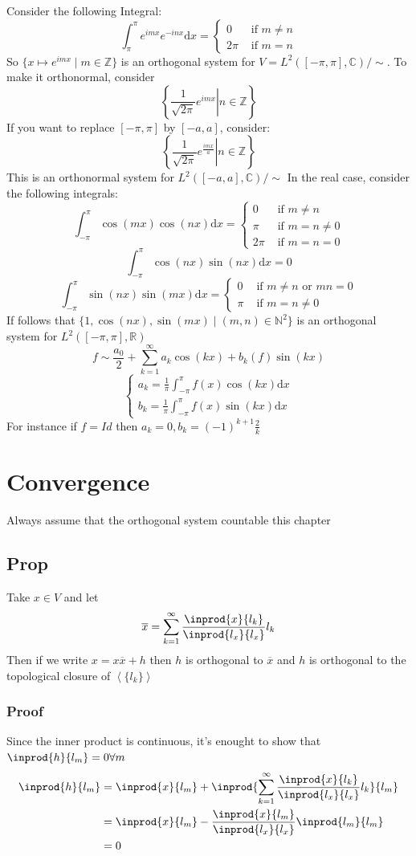 \documentclass{book}
\begin{document}
Consider the following Integral:
$$\int_{\pi}^\pi e^{imx}e^{-inx}\text{d}x=\begin{cases}
    0 & \text{ if }m\neq n\\2\pi&\text{ if }m=n
\end{cases}$$
So $\{x\mapsto e^{imx}\mid m\in \mathbb{Z}\}$ is an orthogonal system for $V=L^2([-\pi,\pi],\mathbb{C})/\sim$. To make it orthonormal, consider
$$\left\{\left.\frac{1}{\sqrt{2\pi}}e^{imx}\right| n\in \mathbb{Z}\right\}$$
If you want to replace $[-\pi,\pi]$ by $[-a,a]$, consider:
$$\left\{\left.\frac{1}{\sqrt{2\pi}}e^{\frac{imx}a}\right| n\in \mathbb{Z}\right\}$$
This is an orthonormal system for $L^2([-a,a],\mathbb{C})/\sim$ In the real case, consider the following integrals:
$$\int_{-\pi}^\pi\cos(mx)\cos(nx)\text{d}x=\begin{cases}
    0 & \text{ if }m\neq n\\\pi &\text{ if }m=n\neq0\\2\pi&\text{ if }m=n=0
\end{cases}$$
$$\int_{-\pi}^\pi\cos(nx)\sin(nx)\text{d}x=0$$
$$\int_{-\pi}^\pi\sin(nx)\sin(mx)\text{d}x=\begin{cases}
    0 & \text{ if }m\neq n\text{ or }mn=0\\\pi &\text{ if }m=n\neq0
\end{cases}$$
If follows that $\{1,\cos(nx),\sin(mx)\mid(m,n)\in \mathbb{N}^2\}$ is an orthogonal system for $L^2([-\pi,\pi],\mathbb{R})$
$$f\sim\frac{a_0}{2}+\sum\limits_{k=1}^\infty a_k\cos(kx)+b_k(f)\sin(kx)$$
$$\begin{cases}
    a_k=\frac{1}\pi\int_{-\pi}^\pi f(x)\cos(kx)\text{d}x\\
    b_k=\frac{1}\pi\int_{-\pi}^\pi f(x)\sin(kx)\text{d}x
\end{cases}$$
For instance if $f=Id$ then $a_k=0,b_k=(-1)^{k+1}\frac{2}{k}$
\chapter{Convergence}
Always assume that the orthogonal system countable this chapter
\section{Prop}Take $x\in V$ and let$$\overline x=\sum\limits_{k=1}^\infty\frac{\inprod{x}{l_k}}{\inprod{l_x}{l_x}}l_k$$
Then if we write $x=x\overline x+h$ then $h$ is orthogonal to $\overline{x}$ and $h$ is orthogonal to the topological closure of $\left<\{l_k\}\right>$
\subsection*{Proof}Since the inner product is continuous, it's enought to show that $\inprod{h}{l_m}=0\forall m$
$$
\begin{aligned}
    \inprod{h}{l_m} &=\inprod{x}{l_m}+\inprod{\sum\limits_{k=1}^\infty \frac{\inprod{x}{l_k}}{\inprod{l_x}{l_x}}l_k}{l_m}\\
    &=\inprod{x}{l_m}-\frac{\inprod{x}{l_m}}{\inprod{l_x}{l_x}}\inprod{l_m}{l_m}\\ &=0
\end{aligned}
$$
\end{document}
